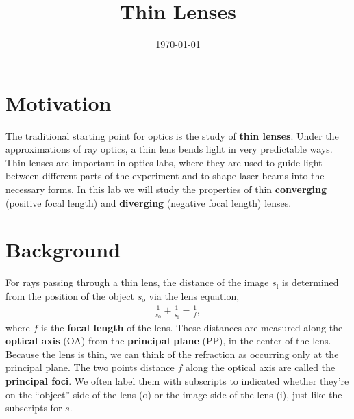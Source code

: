 \documentclass[]{manual}
\title{Thin Lenses}
\date{\today}
\begin{document}
    \maketitle
    \thispagestyle{firstpage}


    \section*{Motivation}

    The traditional starting point for optics is the study of \textbf{thin lenses}.
    Under the approximations of ray optics, a thin lens bends light in very predictable ways.
    Thin lenses are important in optics labs, where they are used to guide light between different parts of the experiment and to shape laser beams into the necessary forms.
    In this lab we will study the properties of thin \textbf{converging} (positive focal length) and \textbf{diverging} (negative focal length) lenses.

    \section*{Background}

    For rays passing through a thin lens, the distance of the image $s_{\mathrm{i}}$ is determined from the position of the object $s_{\mathrm{o}}$ via the lens equation,
    \begin{align} \label{eqn:lens-equation}
        \frac{1}{s_0} + \frac{1}{s_{\mathrm{i}}} = \frac{1}{f},
    \end{align}
    where $f$ is the \textbf{focal length} of the lens.
    These distances are measured along the \textbf{optical axis} (OA) from the \textbf{principal plane} (PP), in the center of the lens.
    Because the lens is thin, we can think of the refraction as occurring only at the principal plane.
    The two points distance $f$ along the optical axis are called the \textbf{principal foci}.
    We often label them with subscripts to indicated whether they're on the ``object'' side of the lens (o) or the image side of the lens (i), just like the subscripts for $s$.
\end{document}
